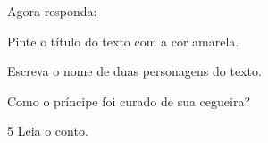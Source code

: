 Agora responda:

\begin{escolha}
\item Pinte o título do texto com a cor amarela.

\item Escreva o nome de duas personagens do texto.


\item Como o príncipe foi curado de sua cegueira?


\end{escolha}

\num{5} Leia o conto.


